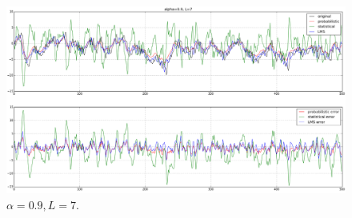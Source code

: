 \begin{enumerate}[(a)]
\begin{figure}[htbp]
	\centering
	\includegraphics[width=\textwidth]{images/p5-6}
	\caption{$\alpha=0.9, L=7$.}
	\label{fig:p5-6}
\end{figure}

\end{enumerate}

\newpage